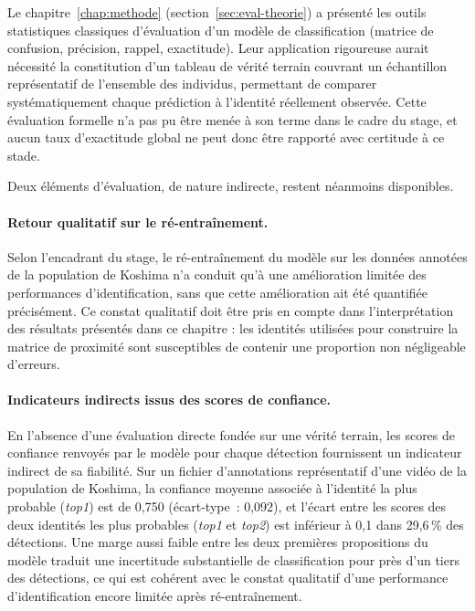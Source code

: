 \documentclass[11pt,a4paper]{report}
\begin{document}
Le chapitre~\ref{chap:methode} (section~\ref{sec:eval-theorie}) a présenté les
outils statistiques classiques d'évaluation d'un modèle de classification
(matrice de confusion, précision, rappel, exactitude). Leur application
rigoureuse aurait nécessité la constitution d'un tableau de vérité terrain
couvrant un échantillon représentatif de l'ensemble des individus, permettant
de comparer systématiquement chaque prédiction à l'identité réellement
observée. Cette évaluation formelle n'a pas pu être menée à son terme dans le
cadre du stage, et aucun taux d'exactitude global ne peut donc être rapporté
avec certitude à ce stade.

Deux éléments d'évaluation, de nature indirecte, restent néanmoins
disponibles.

\paragraph{Retour qualitatif sur le ré-entraînement.}

Selon l'encadrant du stage, le ré-entraînement du modèle sur les données
annotées de la population de Koshima n'a conduit qu'à une amélioration limitée
des performances d'identification, sans que cette amélioration ait été
quantifiée précisément. Ce constat qualitatif doit être pris en compte dans
l'interprétation des résultats présentés dans ce chapitre : les identités
utilisées pour construire la matrice de proximité sont susceptibles de
contenir une proportion non négligeable d'erreurs.

\paragraph{Indicateurs indirects issus des scores de confiance.}

En l'absence d'une évaluation directe fondée sur une vérité terrain, les
scores de confiance renvoyés par le modèle pour chaque détection fournissent
un indicateur indirect de sa fiabilité. Sur un fichier d'annotations
représentatif d'une vidéo de la population de Koshima, la confiance moyenne
associée à l'identité la plus probable (\emph{top1}) est de 0,750
(écart-type~: 0,092), et l'écart entre les scores des deux identités les plus
probables (\emph{top1} et \emph{top2}) est inférieur à 0,1 dans 29,6\,\% des
détections. Une marge aussi faible entre les deux premières propositions du
modèle traduit une incertitude substantielle de classification pour près
d'un tiers des détections, ce qui est cohérent avec le constat qualitatif
d'une performance d'identification encore limitée après ré-entraînement.
\end{document}
